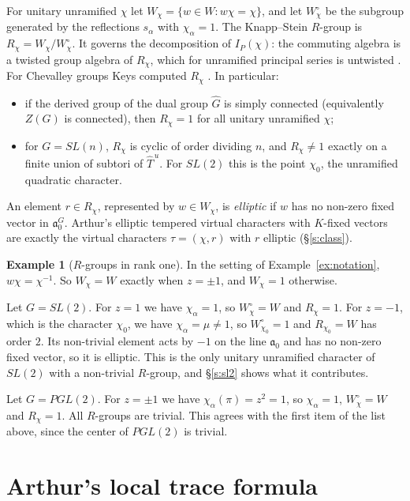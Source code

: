 \documentclass[12pt,letterpaper]{article}
\numberwithin{equation}{section}
\theoremstyle{plain}
\theoremstyle{definition}
\newtheorem{example}[theorem]{Example}
\theoremstyle{remark}
\newcommand{\fa}{\mathfrak{a}}
\newcommand{\Thu}{\widehat{T}^{\,u}}
\begin{document}
For unitary unramified $\chi$ let $W_\chi=\{w\in W:w\chi=\chi\}$, and let $W^\circ_\chi$ be the subgroup generated by the reflections $s_\alpha$ with $\chi_\alpha=1$. The Knapp--Stein $R$-group is $R_\chi=W_\chi/W^\circ_\chi$. It governs the decomposition of $I_P(\chi)$: the commuting algebra is a twisted group algebra of $R_\chi$, which for unramified principal series is untwisted \cite{Ke82}. For Chevalley groups Keys computed $R_\chi$ \cite{Ke82}. In particular:
\begin{itemize}
\item if the derived group of the dual group $\hat G$ is simply connected (equivalently $Z(G)$ is connected), then $R_\chi=1$ for all unitary unramified $\chi$;
\item for $G=SL(n)$, $R_\chi$ is cyclic of order dividing $n$, and $R_\chi\ne1$ exactly on a finite union of subtori of $\Thu$. For $SL(2)$ this is the point $\chi_0$, the unramified quadratic character.
\end{itemize}

An element $r\in R_\chi$, represented by $w\in W_\chi$, is \emph{elliptic} if $w$ has no non-zero fixed vector in $\fa_0^G$. Arthur's elliptic tempered virtual characters with $K$-fixed vectors are exactly the virtual characters $\tau=(\chi,r)$ with $r$ elliptic (\S\ref{s:class}).

\begin{example}[$R$-groups in rank one]\label{ex:R}
In the setting of Example~\ref{ex:notation}, $w\chi=\chi^{-1}$. So $W_\chi=W$ exactly when $z=\pm1$, and $W_\chi=1$ otherwise.

Let $G=SL(2)$. For $z=1$ we have $\chi_\alpha=1$, so $W^\circ_\chi=W$ and $R_\chi=1$. For $z=-1$, which is the character $\chi_0$, we have $\chi_\alpha=\mu\ne1$, so $W^\circ_{\chi_0}=1$ and $R_{\chi_0}=W$ has order $2$. Its non-trivial element acts by $-1$ on the line $\fa_0$ and has no non-zero fixed vector, so it is elliptic. This is the only unitary unramified character of $SL(2)$ with a non-trivial $R$-group, and \S\ref{s:sl2} shows what it contributes.

Let $G=PGL(2)$. For $z=\pm1$ we have $\chi_\alpha(\pi)=z^2=1$, so $\chi_\alpha=1$, $W^\circ_\chi=W$ and $R_\chi=1$. All $R$-groups are trivial. This agrees with the first item of the list above, since the center of $PGL(2)$ is trivial.
\end{example}

\section{Arthur's local trace formula}\label{s:ltf}
\end{document}
